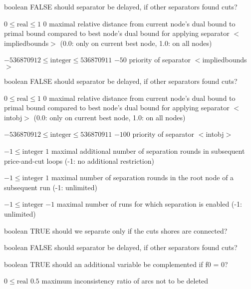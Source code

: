 %
{boolean}%
{FALSE}%
{should separator be delayed, if other separators found cuts?}%
{}

%
{$0\leq\textrm{real}\leq1$}%
{$0$}%
{maximal relative distance from current node's dual bound to primal bound compared to best node's dual bound for applying separator $<$impliedbounds$>$ (0.0: only on current best node, 1.0: on all nodes)}%
{}

%
{$-536870912\leq\textrm{integer}\leq536870911$}%
{$-50$}%
{priority of separator $<$impliedbounds$>$}%
{}

%
{boolean}%
{FALSE}%
{should separator be delayed, if other separators found cuts?}%
{}

%
{$0\leq\textrm{real}\leq1$}%
{$0$}%
{maximal relative distance from current node's dual bound to primal bound compared to best node's dual bound for applying separator $<$intobj$>$ (0.0: only on current best node, 1.0: on all nodes)}%
{}

%
{$-536870912\leq\textrm{integer}\leq536870911$}%
{$-100$}%
{priority of separator $<$intobj$>$}%
{}

%
{$-1\leq\textrm{integer}$}%
{$1$}%
{maximal additional number of separation rounds in subsequent price-and-cut loops (-1: no additional restriction)}%
{}

%
{$-1\leq\textrm{integer}$}%
{$1$}%
{maximal number of separation rounds in the root node of a subsequent run (-1: unlimited)}%
{}

%
{$-1\leq\textrm{integer}$}%
{$-1$}%
{maximal number of runs for which separation is enabled (-1: unlimited)}%
{}

%
{boolean}%
{TRUE}%
{should we separate only if the cuts shores are connected?}%
{}

%
{boolean}%
{FALSE}%
{should separator be delayed, if other separators found cuts?}%
{}

%
{boolean}%
{TRUE}%
{should an additional variable be complemented if f0 = 0?}%
{}

%
{$0\leq\textrm{real}$}%
{$0.5$}%
{maximum inconsistency ratio of arcs not to be deleted}%
{}


